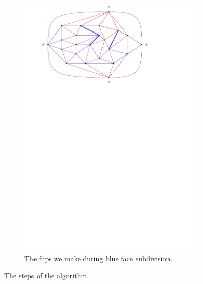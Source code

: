 \begin{figure}
\begin{subfigure}[b]{.9 \textwidth}
      \includegraphics[width=\textwidth]{examples/img/smallExample/smallExample-8}
      \caption{The flips we make during blue face subdivision.}
      \label{fig:ex:simple:8}
    \end{subfigure}
  \caption{The steps of the algorithm.}
  \label{fig:ex:simple}

\end{figure}




